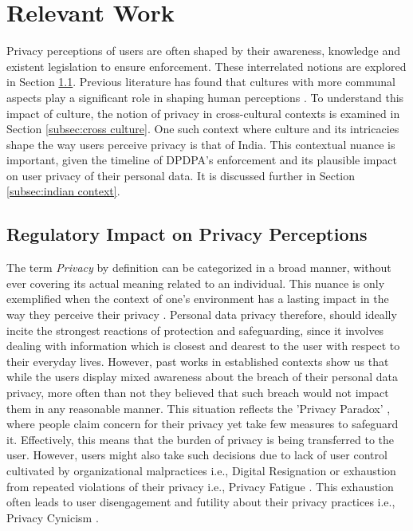 \section{Relevant Work} \label{sec:literature}
Privacy perceptions of users are often shaped by their awareness, knowledge and existent legislation to ensure enforcement. These interrelated notions are explored in Section \ref{subsec:regulatory impact}. Previous literature has found that cultures with more communal aspects play a significant role in shaping human perceptions \cite{altman1977privacy}. To understand this impact of culture, the notion of privacy in cross-cultural contexts is examined in Section \ref{subsec:cross culture}. One such context where culture and its intricacies shape the way users perceive privacy is that of India. This contextual nuance is important, given the timeline of DPDPA's enforcement and its plausible impact on user privacy of their personal data. It is discussed further in Section \ref{subsec:indian context}.  

\subsection{Regulatory Impact on Privacy Perceptions} \label{subsec:regulatory impact}
The term \textit{Privacy} by definition can be categorized in a broad manner, without ever covering its actual meaning related to an individual. This nuance is only exemplified when the context of one's environment has a lasting impact in the way they perceive their privacy \cite{nissenbaum2004privacy}. Personal data privacy therefore, should ideally incite the strongest reactions of protection and safeguarding, since it involves dealing with information which is closest and dearest to the user with respect to their everyday lives. However, past works \cite{zou_ive_nodate, mayer_now_nodate, karunakaran_data_nodate} in established contexts show us that while the users display mixed awareness about the breach of their personal data privacy, more often than not they believed that such breach would not impact them in any reasonable manner. This situation reflects the 'Privacy Paradox' \cite{acquisti_economics_2016}, where people claim concern for their privacy yet take few measures to safeguard it. Effectively, this means that the burden of privacy is being transferred to the user. However, users might also take such decisions due to lack of user control cultivated by organizational malpractices i.e., Digital Resignation \cite{draper_corporate_2019} or exhaustion from repeated violations of their privacy i.e., Privacy Fatigue \cite{choi2018role}. This exhaustion often leads to user disengagement and futility about their privacy practices i.e., Privacy Cynicism \cite{hoffmann_privacy_2016}.  
 

